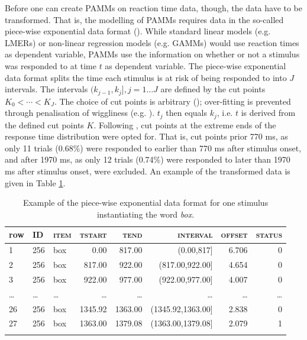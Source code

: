 Before one can create PAMMs on reaction time data, though, the data have to be transformed. That is, the modelling of PAMMs requires data in the so-called piece-wise exponential data format (\cite{Bender2018a}). While standard linear models (e.g. LMERs) or non-linear regression models (e.g. GAMMs) would use reaction times as dependent variable, PAMMs use the information on whether or not a stimulus was responded to at time $t$ as dependent variable. The piece-wise exponential data format splits the time each stimulus is at risk of being responded to into $J$ intervals. The intervals $(k_{j-1},k_j ],j=1…J$ are defined by the cut points $K_0<⋯<K_J$. The choice of cut points is arbitrary (\cite{Hendrix2020}); over-fitting is prevented through penalisation of wiggliness (e.g. \cite{Wood2017}). $t_j$ then equals $k_j$, i.e. $t$ is derived from the defined cut points $K$. Following \citet{Hendrix2020}, cut points at the extreme ends of the response time distribution were opted for. That is, cut points prior 770 ms, as only 11 trials (0.68\%) were responded to earlier than 770 ms after stimulus onset, and after 1970 ms, as only 12 trials (0.74\%) were responded to later than 1970 ms after stimulus onset, were excluded. An example of the transformed data is given in Table \ref{tab:7.4}.

\begin{table}\fontsize{10}{11}
\caption{Example of the piece-wise exponential data format for one stimulus instantiating the word \textit{box}.}
\label{tab:7.4}
\centering
\begin{tabular}{lllrrrrr} 
\lsptoprule
row & \textsc{ID}  & \textsc{item} & \textsc{tstart}  & \textsc{tend}    & \textsc{interval}          & \textsc{offset} & \textsc{status}  \\ 
\midrule
1   & 256 & box  & 0.00    & 817.00  & (0.00,817]        & 6.706  & 0       \\
2   & 256 & box  & 817.00  & 922.00  & (817.00,922.00]   & 4.654  & 0       \\
3   & 256 & box  & 922.00  & 977.00  & (922.00,977.00]   & 4.007  & 0       \\
…   & …   & …    & …       & …       & …                 & …      & …       \\
26  & 256 & box  & 1345.92 & 1363.00 & (1345.92,1363.00] & 2.838  & 0       \\
27  & 256 & box  & 1363.00 & 1379.08 & (1363.00,1379.08] & 2.079  & 1       \\
\lspbottomrule
\end{tabular}
\end{table}

